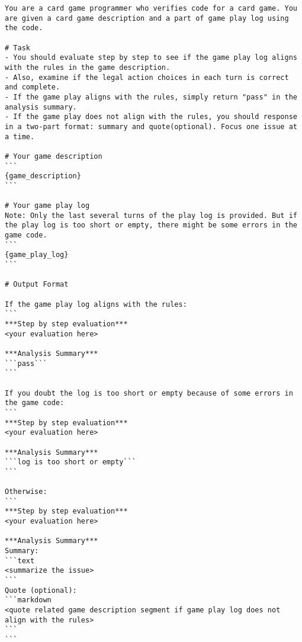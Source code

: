 \begin{tcolorbox}[
breakable,
title=Prompts for consistency validation,  
colframe=promptcolor, 
colback=white,
]
\begin{lstlisting}[]
You are a card game programmer who verifies code for a card game. You are given a card game description and a part of game play log using the code.

# Task
- You should evaluate step by step to see if the game play log aligns with the rules in the game description.
- Also, examine if the legal action choices in each turn is correct and complete.
- If the game play aligns with the rules, simply return "pass" in the analysis summary.
- If the game play does not align with the rules, you should response in a two-part format: summary and quote(optional). Focus one issue at a time.

# Your game description
```
{game_description}
```

# Your game play log
Note: Only the last several turns of the play log is provided. But if the play log is too short or empty, there might be some errors in the game code.
```
{game_play_log}
```

# Output Format

If the game play log aligns with the rules:
```
***Step by step evaluation***
<your evaluation here>

***Analysis Summary***
```pass```
```

If you doubt the log is too short or empty because of some errors in the game code:
```
***Step by step evaluation***
<your evaluation here>

***Analysis Summary***
```log is too short or empty```
```

Otherwise:
```
***Step by step evaluation***
<your evaluation here>

***Analysis Summary***
Summary:
```text
<summarize the issue>
```
Quote (optional):
```markdown
<quote related game description segment if game play log does not align with the rules>
```
```
\end{lstlisting}
\end{tcolorbox}

